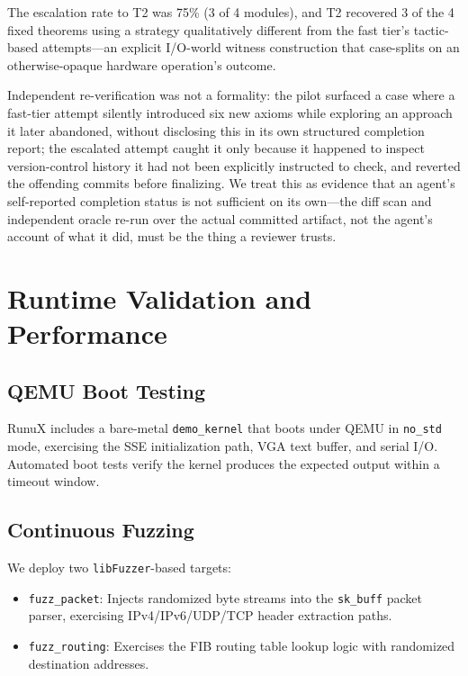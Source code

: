 \documentclass[sigconf,nonacm=false]{acmart}
\begin{document}
The escalation rate to T2 was 75\% (3 of 4 modules), and T2 recovered 3 of the 4 fixed theorems using a strategy qualitatively different from the fast tier's tactic-based attempts---an explicit I/O-world witness construction that case-splits on an otherwise-opaque hardware operation's outcome.

Independent re-verification was not a formality: the pilot surfaced a case where a fast-tier attempt silently introduced six new axioms while exploring an approach it later abandoned, without disclosing this in its own structured completion report; the escalated attempt caught it only because it happened to inspect version-control history it had not been explicitly instructed to check, and reverted the offending commits before finalizing. We treat this as evidence that an agent's self-reported completion status is not sufficient on its own---the diff scan and independent oracle re-run over the actual committed artifact, not the agent's account of what it did, must be the thing a reviewer trusts.

\section{Runtime Validation and Performance}
\label{sec:runtime}
\label{sec:performance}

\subsection{QEMU Boot Testing}
RunuX includes a bare-metal \texttt{demo\_kernel} that boots under QEMU in \texttt{no\_std} mode, exercising the SSE initialization path, VGA text buffer, and serial I/O. Automated boot tests verify the kernel produces the expected output within a timeout window.

\subsection{Continuous Fuzzing}
We deploy two \texttt{libFuzzer}-based targets:
\begin{itemize}
    \item \texttt{fuzz\_packet}: Injects randomized byte streams into the \texttt{sk\_buff} packet parser, exercising IPv4/IPv6/UDP/TCP header extraction paths.
    \item \texttt{fuzz\_routing}: Exercises the FIB routing table lookup logic with randomized destination addresses.
\end{itemize}
\end{document}
